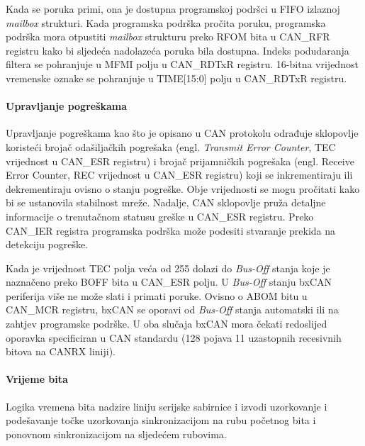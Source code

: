 Kada se poruka primi, ona je dostupna programskoj podršci u FIFO izlaznoj \textit{mailbox} strukturi. Kada programska podrška pročita poruku, programska podrška mora otpustiti \textit{mailbox} strukturu preko RFOM bita u CAN\_RFR registru kako bi sljedeća nadolazeća poruka bila dostupna. Indeks podudaranja filtera se pohranjuje u MFMI polju u CAN\_RDTxR registru. 16-bitna vrijednost vremenske oznake se pohranjuje u TIME[15:0] polju u CAN\_RDTxR registru.

\paragraph{Upravljanje pogreškama}

Upravljanje pogreškama kao što je opisano u CAN protokolu odrađuje sklopovlje koristeći brojač odašiljačkih pogrešaka (engl. \textit{Transmit Error Counter}, TEC vrijednost u CAN\_ESR registru) i brojač prijamničkih pogrešaka (engl. Receive Error Counter, REC vrijednost u CAN\_ESR registru) koji se inkrementiraju ili dekrementiraju ovisno o stanju pogreške. Obje vrijednosti se mogu pročitati kako bi se ustanovila stabilnost mreže. Nadalje, CAN sklopovlje pruža detaljne informacije o trenutačnom statusu greške u CAN\_ESR registru. Preko CAN\_IER registra programska podrška može podesiti stvaranje prekida na detekciju pogreške.

Kada je vrijednost TEC polja veća od 255 dolazi do \textit{Bus-Off} stanja koje je naznačeno preko BOFF bita u CAN\_ESR polju. U \textit{Bus-Off} stanju bxCAN periferija više ne može slati i primati poruke. Ovisno o ABOM bitu u CAN\_MCR registru, bxCAN se oporavi od \textit{Bus-Off} stanja automatski ili na zahtjev programske podrške. U oba slučaja bxCAN mora čekati redoslijed oporavka specificiran u CAN standardu (128 pojava 11 uzastopnih recesivnih bitova na CANRX liniji).

\paragraph{Vrijeme bita}

Logika vremena bita nadzire liniju serijske sabirnice i izvodi uzorkovanje i podešavanje točke uzorkovanja sinkronizacijom na rubu početnog bita i ponovnom sinkronizacijom na sljedećem rubovima.

